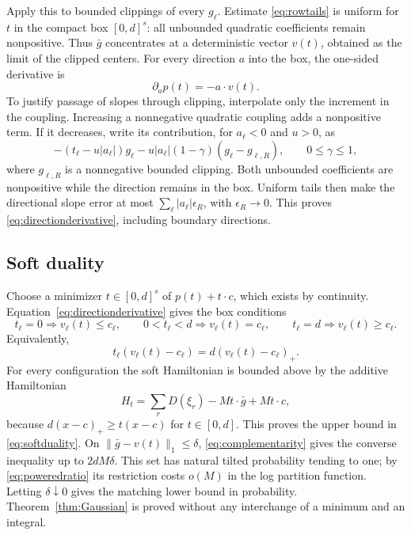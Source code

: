 \documentclass[11pt]{article}
\numberwithin{equation}{section}
\theoremstyle{definition}
\newcommand{\norm}[1]{\lVert #1\rVert}
\begin{document}
Apply this to bounded clippings of every $g_\ell$. Estimate \eqref{eq:rowtails} is uniform for $t$ in the compact box $[0,d]^s$: all unbounded quadratic coefficients remain nonpositive. Thus $\bar g$ concentrates at a deterministic vector $v(t)$, obtained as the limit of the clipped centers. For every direction $a$ into the box, the one-sided derivative is
\begin{equation}\label{eq:directionderivative}
\partial_a p(t)=-a\cdot v(t).
\end{equation}
To justify passage of slopes through clipping, interpolate only the increment in the coupling. Increasing a nonnegative quadratic coupling adds a nonpositive term. If it decreases, write its contribution, for $a_\ell<0$ and $u>0$, as
\[
-(t_\ell-u|a_\ell|)g_\ell
-u|a_\ell|(1-\gamma)(g_\ell-g_{\ell,R}),\qquad 0\le\gamma\le1,
\]
where $g_{\ell,R}$ is a nonnegative bounded clipping. Both unbounded coefficients are nonpositive while the direction remains in the box. Uniform tails then make the directional slope error at most $\sum_\ell|a_\ell|\epsilon_R$, with $\epsilon_R\to0$. This proves \eqref{eq:directionderivative}, including boundary directions.

\subsection{Soft duality}
Choose a minimizer $t\in[0,d]^s$ of $p(t)+t\cdot c$, which exists by continuity. Equation~\eqref{eq:directionderivative} gives the box conditions
\[
 t_\ell=0\Rightarrow v_\ell(t)\le c_\ell,\qquad
 0<t_\ell<d\Rightarrow v_\ell(t)=c_\ell,\qquad
 t_\ell=d\Rightarrow v_\ell(t)\ge c_\ell.
\]
Equivalently,
\begin{equation}\label{eq:complementarity}
t_\ell(v_\ell(t)-c_\ell)=d(v_\ell(t)-c_\ell)_+.
\end{equation}
For every configuration the soft Hamiltonian is bounded above by the additive Hamiltonian
\[
H_t=\sum_rD(\xi_r)-Mt\cdot\bar g+Mt\cdot c,
\]
because $d(x-c)_+\ge t(x-c)$ for $t\in[0,d]$. This proves the upper bound in \eqref{eq:softduality}. On $\norm{\bar g-v(t)}_1\le\delta$, \eqref{eq:complementarity} gives the converse inequality up to $2dM\delta$. This set has natural tilted probability tending to one; by \eqref{eq:poweredratio} its restriction costs $o(M)$ in the log partition function. Letting $\delta\downarrow0$ gives the matching lower bound in probability. Theorem~\ref{thm:Gaussian} is proved without any interchange of a minimum and an integral.
\end{document}
